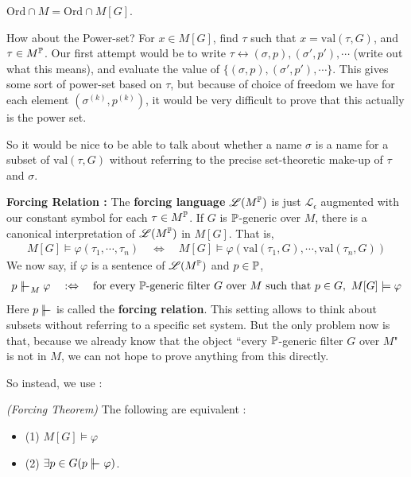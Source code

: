 \documentclass[12pt,a4paper]{article}
\renewenvironment{i}
{\begin{itemize} 
	}%
	{\end{itemize}
}
\begin{document}
\corr $\text{Ord} \cap M = \text{Ord} \cap M[G]$. 
\s

How about the Power-set? For $x\in M[G]$, find $\tau$ such that $x= \text{val}(\tau, G)$, and $\tau \in M^{\mathbb{P}}$. Our first attempt would be to write $\tau \leftrightarrow (\sigma, p), (\sigma', p'), \cdots$ (write out what this means), and evaluate the value of $\{ (\sigma, p), (\sigma', p'), \cdots \}$. This gives some sort of power-set based on $\tau$, but because of choice of freedom we have for each element $(\sigma^{(k)}, p^{(k)})$, it would be very difficult to prove that this actually is the power set.

\quad So it would be nice to be able to talk about whether a name $\sigma$ is a name for a subset of $\text{val}(\tau, G)$ without referring to the precise set-theoretic make-up of $\tau$ and $\sigma$. 
\s

\textbf{Forcing Relation :} The \textbf{forcing language} $\mathscr{L}(M^{\mathbb{P}})$ is just $\mathscr{L}_{\epsilon}$ augmented with our constant symbol for each $\tau \in M^{\mathbb{P}}$. If $G$ is $\mathbb{P}$-generic over $M$, there is a canonical interpretation of $\mathscr{L}(M^{\mathbb{P}})$ in $M[G]$. That is,
\begin{align*}
M[G] \models \varphi(\tau_1, \cdots, \tau_n) \quad \Leftrightarrow \quad M[G] \models \varphi(\text{val}(\tau_1, G), \cdots, \text{val}(\tau_n, G))
\end{align*}
We now say, if $\varphi$ is a sentence of $\mathscr{L}(M^{\mathbb{P}})$ and $p\in \mathbb{P}$,
\begin{align*}
p\forces_M \varphi \quad :\Leftrightarrow \quad \text{for every } \poset\text{-generic filter } G \text{ over } M \text{ such that } p\in G, \,\, M[G] \models \varphi
\end{align*}
Here $p\forces$ is called the \textbf{forcing relation}. This setting allows to think about subsets without referring to a specific set system. But the only problem now is that, because we already know that the object ``every $\mathbb{P}$-generic filter $G$ over $M$" is not in $M$, we can not hope to prove anything from this directly.
\s

So instead, we use :

\thm \emph{(Forcing Theorem)} The following are equivalent : 
\begin{i}
\item[(1)] $M[G] \models \varphi$
\item[(2)] $\exists p\in G (p\forces \varphi)$.
\end{i}
\s
\end{document}
